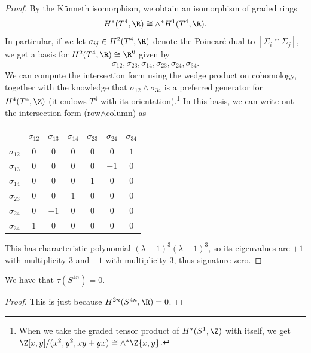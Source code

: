 \documentclass[11pt]{book}
\begin{document}
\begin{proof}
By the K\"{u}nneth isomorphism, we obtain an isomorphism of graded rings
\begin{align*}
    H^\ast(T^4,\R) \cong \wedge^\ast H^1(T^4,\R).
\end{align*}
In particular, if we let $\sigma_{ij}\in H^2(T^4,\R)$ denote the Poincar\'e dual to $[\Sigma_i \cap \Sigma_j]$, we get a basis for $H^2(T^4,\R) \cong \R^6$ given by
\begin{align*}
    \sigma_{12}, \sigma_{23}, \sigma_{14}, \sigma_{23}, \sigma_{24}, \sigma_{34}.
\end{align*}
We can compute the intersection form using the wedge product on cohomology, together with the knowledge that $\sigma_{12}\wedge \sigma_{34}$ is a preferred generator for $H^4(T^4,\Z)$ (it endows $T^4$ with its orientation).\footnote{When we take the graded tensor product of $H^\ast(S^1,\Z)$ with itself, we get $\Z[x,y]/(x^2,y^2,xy+yx) \cong \wedge^\ast \Z\{x,y\}$.} In this basis, we can write out the intersection form (row$\wedge$column) as
\begin{center}
    \begin{tabular}{c | c c c c c c}
    & $\sigma_{12}$& $\sigma_{13}$& $\sigma_{14}$& $\sigma_{23}$& $\sigma_{24}$& $\sigma_{34}$ \\
    \hline
    $\sigma_{12}$ & $0$ & $0$ & $0$ & $0$ & $0$ & $1$ \\
    $\sigma_{13}$ & $0$ & $0$ & $0$ & $0$ & $-1$ & $0$ \\
    $\sigma_{14}$ & $0$ & $0$ & $0$ & $1$ & $0$ & $0$ \\
    $\sigma_{23}$ & $0$ & $0$ & $1$ & $0$ & $0$ & $0$ \\
    $\sigma_{24}$ & $0$ & $-1$ & $0$ & $0$ & $0$ & $0$ \\
    $\sigma_{34}$ & $1$ & $0$ & $0$ & $0$ & $0$ & $0$
    \end{tabular}
\end{center}
This has characteristic polynomial $(\lambda-1)^3(\lambda+1)^3$, so its eigenvalues are $+1$ with multiplicity $3$ and $-1$ with multiplicity $3$, thus signature zero.
\end{proof}

\begin{example} We have that $\tau(S^{4n}) = 0$.
\end{example}
\begin{proof} This is just because $H^{2n}(S^{4n},\R) = 0$.
\end{proof}
\end{document}
